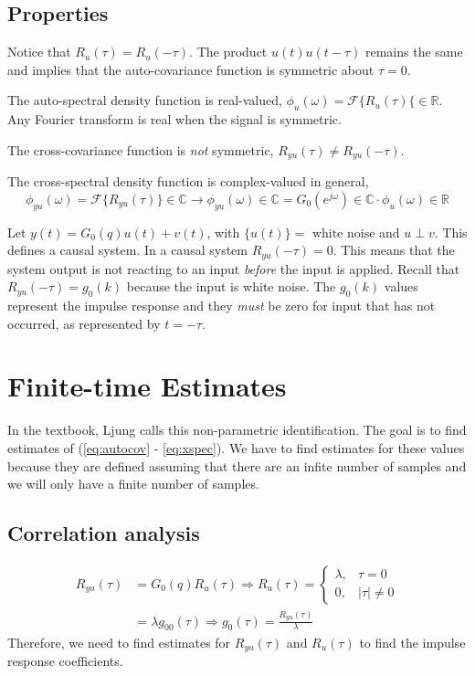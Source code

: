 \documentclass[lecture,12pt,]{pcms-l}
\theoremstyle{example}
\newcommand{\w}{\omega}
\begin{document}
\subsection{Properties}
Notice that $R_u(\tau)=R_u(-\tau)$. The product $u(t)u(t-\tau)$ remains the same and implies that the auto-covariance function is symmetric about $\tau=0$.

The auto-spectral density function is real-valued, $\phi_u(\w) = \mathcal{F}\{R_u(\tau)\{\in\mathbb{R}$. Any Fourier transform is real when the signal is symmetric.

The cross-covariance function is \textit{not} symmetric, $R_{yu}(\tau)\neq R_{yu}(-\tau)$.

The cross-spectral density function is complex-valued in general,
$$\phi_{yu}(\w) = \mathcal{F}\{R_{yu}(\tau)\}\in\mathbb{C} \rightarrow \phi_{yu}(\w)\in\mathbb{C} = G_0(e^{j\w})\in\mathbb{C} \cdot \phi_u(\w)\in\mathbb{R}$$

Let $y(t) = G_0(q)u(t)+v(t)$, with $\{u(t)\}=\text{ white noise}$ and $u\perp v$. This defines a causal system. In a causal system $R_{yu}(-\tau)=0$. This means that the system output is not reacting to an input \textit{before} the input is applied. Recall that $R_{yu}(-\tau)=g_0(k)$ because the input is white noise. The $g_0(k)$ values represent the impulse response and they \textit{must} be zero for input that has not occurred, as represented by $t=-\tau$.

\section{Finite-time Estimates}
In the textbook, Ljung calls this non-parametric identification. The goal is to find estimates of (\ref{eq:autocov} - \ref{eq:xspec}). We have to find estimates for these values because they are defined assuming that there are an infite number of samples and we will only have a finite number of samples.

\subsection{Correlation analysis}
\begin{align*}
R_{yu}(\tau) &= G_0(q)R_u(\tau) \Rightarrow R_u(\tau) = \begin{cases} \lambda, & \tau=0 \\ 0, & |\tau|\neq 0 \end{cases} \\
&= \lambda g_00(\tau) \Rightarrow g_0(\tau) = \frac{R_{yu}(\tau)}{\lambda}
\end{align*}
Therefore, we need to find estimates for $R_{yu}(\tau)$ and $R_u(\tau)$ to find the impulse response coefficients.
\end{document}
